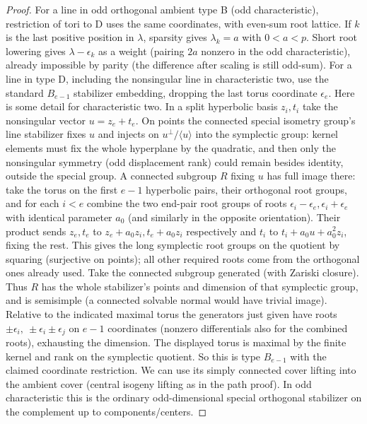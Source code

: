 \begin{proof}
For a line in odd orthogonal ambient type B (odd characteristic), restriction of tori to D uses the same coordinates, with even-sum root lattice. If \(k\) is the last positive position in \(\lambda\), sparsity gives \(\lambda_k=a\) with \(0<a<p\). Short root lowering gives \(\lambda-\epsilon_k\) as a weight (pairing \(2a\) nonzero in the odd characteristic), already impossible by parity (the difference after scaling is still odd-sum). For a line in type D, including the nonsingular line in characteristic two, use the standard \(B_{e-1}\) stabilizer embedding, dropping the last torus coordinate \(\epsilon_e\). Here is some detail for characteristic two. In a split hyperbolic basis \(z_i,t_i\) take the nonsingular vector \(u=z_e+t_e\). On points the connected special isometry group's line stabilizer fixes \(u\) and injects on \(u^\perp/\langle u\rangle\) into the symplectic group: kernel elements must fix the whole hyperplane by the quadratic, and then only the nonsingular symmetry (odd displacement rank) could remain besides identity, outside the special group. A connected subgroup \(R\) fixing \(u\) has full image there: take the torus on the first \(e-1\) hyperbolic pairs, their orthogonal root groups, and for each \(i<e\) combine the two end-pair root groups of roots \(\epsilon_i-\epsilon_e,\epsilon_i+\epsilon_e\) with identical parameter \(a_0\) (and similarly in the opposite orientation). Their product sends \(z_e,t_e\) to \(z_e+a_0 z_i,t_e+a_0 z_i\) respectively and \(t_i\) to \(t_i+a_0u+a_0^2 z_i\), fixing the rest. This gives the long symplectic root groups on the quotient by squaring (surjective on points); all other required roots come from the orthogonal ones already used. Take the connected subgroup generated (with Zariski closure). Thus \(R\) has the whole stabilizer's points and dimension of that symplectic group, and is semisimple (a connected solvable normal would have trivial image). Relative to the indicated maximal torus the generators just given have roots \(\pm\epsilon_i,\ \pm\epsilon_i\pm\epsilon_j\) on \(e-1\) coordinates (nonzero differentials also for the combined roots), exhausting the dimension. The displayed torus is maximal by the finite kernel and rank on the symplectic quotient. So this is type \(B_{e-1}\) with the claimed coordinate restriction. We can use its simply connected cover lifting into the ambient cover (central isogeny lifting as in the path proof). In odd characteristic this is the ordinary odd-dimensional special orthogonal stabilizer on the complement up to components/centers.


\end{proof}
